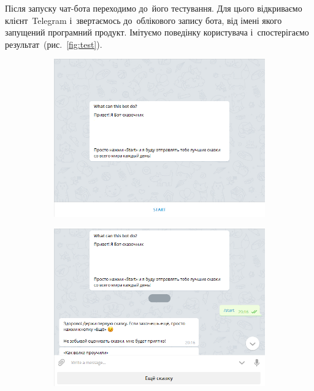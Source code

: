 \documentclass[
	a4paper,
	oneside,
	BCOR = 10mm,
	DIV = 12,
	12pt,
	headings = normal,
]{scrartcl}
\begin{document}
			Після запуску чат-бота переходимо до~його тестування. Для цього відкриваємо клієнт~\textenglish{Telegram} і~звертаємось до~облікового запису бота, від імені якого запущений програмний продукт. Імітуємо поведінку користувача і~спостерігаємо результат~(рис.~\ref{fig:test}).
			\begin{figure}[!htbp]
				\begin{subfigure}[t]{0.5\baselineskip}
					\centering
					\includegraphics[width=\columnwidth]{./assets/y03s02-practice-01-report-p01.png}
					\caption{}
					\label{subfig:test-01}
				\end{subfigure}%
				\hspace{\baselineskip}%
				\begin{subfigure}[t]{0.5\baselineskip}
					\centering
					\includegraphics[width=\columnwidth]{./assets/y03s02-practice-01-report-p02.png}

\end{subfigure}
\end{figure}
\end{document}
